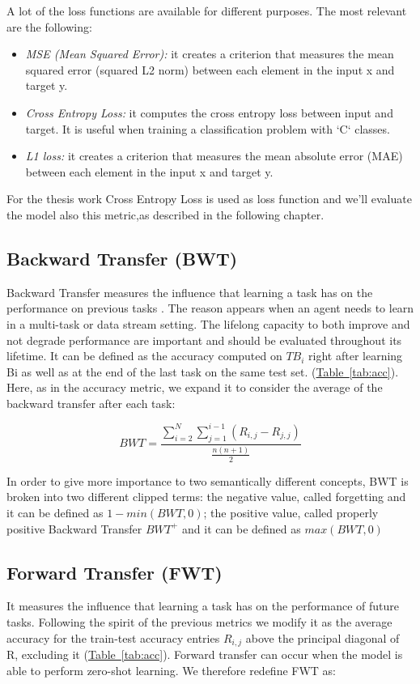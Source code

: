 \documentclass[english, LaM, oneside]{sapthesis}%
\begin{document}
A lot of the loss functions are available for different purposes. The most relevant are the following:
\begin{itemize}
    \item \textit{MSE (Mean Squared Error): }it creates a criterion that measures the mean squared error (squared L2 norm) between each element in the input x and target y.
    \item \textit{Cross Entropy Loss:} it computes the cross entropy loss between input and target. It is useful when training a classification problem with `C` classes.
    \item \textit{ L1 loss:} it creates a criterion that measures the mean absolute error (MAE) between each element in the input x and target y.
\end{itemize}

For the thesis work Cross Entropy Loss is used as loss function and we'll evaluate the model also this metric,as described in the following chapter. 
\subsection{Backward Transfer (BWT)}
Backward Transfer measures the influence that learning a task has on the performance on previous tasks \cite{lopez}. The reason appears when an agent needs to learn in a multi-task or data stream setting. The lifelong capacity to both improve and not degrade performance are important and should be evaluated throughout its lifetime. It can be defined as the accuracy computed on $TB_i$ right after learning Bi as well as at the end of the last task on the same test set. (\hyperref[tab:acc]{Table~\ref*{tab:acc}}). Here, as in the accuracy metric, we expand it to consider the average of the backward transfer after each task:

\begin{equation}
                 BWT = \frac{\sum_{i=2}^{N}{\sum_{j=1}^{i-1}{(R_{i,j} - R_{j,j})}}}{\frac{n(n+1)}{2} } 
\end{equation}

In order to give more importance to two semantically different concepts, BWT is broken into two different clipped terms: the negative value, called forgetting and it can be defined as $1 -  min(BWT, 0)$; the positive value, called properly positive Backward Transfer $BWT^+$ and it can be defined as $max(BWT, 0)$
\vspace{5mm}
\subsection{Forward Transfer (FWT)}
It measures the influence that learning a task has on the performance of future tasks. Following the spirit of the previous metrics we modify it as the average accuracy for the train-test accuracy entries $R_{i,j}$ above the principal diagonal of R, excluding it (\hyperref[tab:acc]{Table~\ref*{tab:acc}}). Forward transfer can occur when the model is able to perform zero-shot learning. We therefore redefine FWT as:
\end{document}
